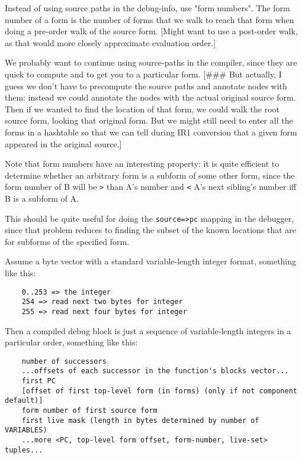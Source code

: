 Instead of using source paths in the debug-info, use "form numbers".  The form
number of a form is the number of forms that we walk to reach that form when
doing a pre-order walk of the source form.  [Might want to use a post-order
walk, as that would more closely approximate evaluation order.]


We probably want to continue using source-paths in the compiler, since they are
quick to compute and to get you to a particular form.  [\#\#\# But actually, I
guess we don't have to precompute the source paths and annotate nodes with
them: instead we could annotate the nodes with the actual original source form.
Then if we wanted to find the location of that form, we could walk the root
source form, looking that original form.  But we might still need to enter all
the forms in a hashtable so that we can tell during IR1 conversion that a given
form appeared in the original source.]


Note that form numbers have an interesting property: it is quite efficient to
determine whether an arbitrary form is a subform of some other form, since the
form number of B will be \verb+>+ than A's number and \verb+<+ A's next sibling's number iff
B is a subform of A.  

This should be quite useful for doing the \verb|source=>pc| mapping in the debugger,
since that problem reduces to finding the subset of the known locations that
are for subforms of the specified form.


Assume a byte vector with a standard variable-length integer format, something
like this:

\begin{verbatim}
    0..253 => the integer
    254 => read next two bytes for integer
    255 => read next four bytes for integer
\end{verbatim}

Then a compiled debug block is just a sequence of variable-length integers in a
particular order, something like this:

\begin{verbatim}
    number of successors
    ...offsets of each successor in the function's blocks vector...
    first PC
    [offset of first top-level form (in forms) (only if not component default)]
    form number of first source form
    first live mask (length in bytes determined by number of VARIABLES)
    ...more <PC, top-level form offset, form-number, live-set> tuples...
\end{verbatim}

